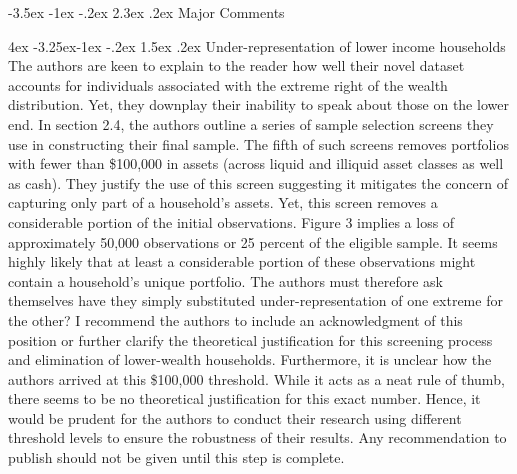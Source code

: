 \documentclass[]{article}
\makeatletter
\newcommand{\bb}{\bigbreak\noindent}
\renewcommand\section{\leftskip 0pt\@startsection {section}{1}{\z@}%
	{-3.5ex \@plus -1ex \@minus -.2ex}%
	{2.3ex \@plus.2ex}%
	{\normalfont\Large\bfseries}}
\renewcommand\subsection{\leftskip 4ex\@startsection{subsection}{2}{\z@}%
	{-3.25ex\@plus -1ex \@minus -.2ex}%
	{1.5ex \@plus .2ex}%
	{\normalfont\large\bfseries}}
\makeatother
\begin{document}
\begin{spacing}{1.1}
\section{Major Comments}


\subsection{Under-representation of lower income households}
The authors are keen to explain to the reader how well their novel dataset accounts for individuals associated with the extreme right of the wealth distribution. Yet, they downplay their inability to speak about those on the lower end. 
In section 2.4, the authors outline a series of sample selection screens they use in constructing their final sample. The fifth of such screens removes portfolios with fewer than \$100,000 in assets (across liquid and illiquid asset classes as well as cash). They justify the use of this screen suggesting it mitigates the concern of capturing only part of a household's assets. Yet, this screen removes a considerable portion of the initial observations. Figure 3 implies a loss of approximately 50,000 observations or 25 percent of the eligible sample. It seems highly likely that at least a considerable portion of these observations might contain a household's unique portfolio. The authors must therefore ask themselves have they simply substituted under-representation of one extreme for the other? I recommend the authors to include an acknowledgment of this position or further clarify the theoretical justification for this screening process and elimination of lower-wealth households. 
\bb
Furthermore, it is unclear how the authors arrived at this \$100,000 threshold. While it acts as a neat rule of thumb, 
there seems to be no theoretical justification for this exact number. Hence, it would be prudent for the authors to conduct their research using different threshold levels to ensure the robustness of their results. Any recommendation to publish should not be given until this step is complete.

	
	

\end{spacing}
\end{document}
